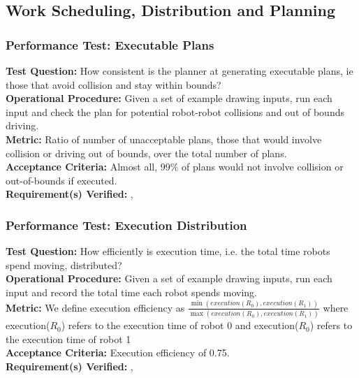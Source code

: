 
\subsection{Work Scheduling, Distribution and Planning}
\label{sec:verification_sdp}

\subsubsection{Performance Test: Executable Plans}
\label{test:sdp_pt_executable}
\textbf{Test Question:} How consistent is the planner at generating executable plans, ie those that avoid collision and stay within bounds? \\
\textbf{Operational Procedure:} Given a set of example drawing inputs, run each input and check the plan for potential robot-robot collisions and out of bounds driving. \\
\textbf{Metric:} Ratio of number of unacceptable plans, those that would involve collision or driving out of bounds, over the total number of plans. \\
\textbf{Acceptance Criteria:} Almost all, 99\% of plans would not involve collision or out-of-bounds if executed. \\
\textbf{Requirement(s) Verified:} , 

\subsubsection{Performance Test: Execution Distribution}
\label{test:sdp_pt_execu}
\textbf{Test Question:} How efficiently is execution time, i.e. the total time robots spend moving, distributed?\\
\textbf{Operational Procedure:} Given a set of example drawing inputs, run each input and record the total time each robot spends moving. \\
\textbf{Metric:} We define execution efficiency as $\frac{\min(execution(R_{0}), execution(R_{1}))}{\max(execution(R_{0}), execution(R_{1}))}$ where execution($R_{0}$) refers to the execution time of robot 0 and execution($R_{0}$) refers to the execution time of robot 1\\
\textbf{Acceptance Criteria:} Execution efficiency of 0.75.\\
\textbf{Requirement(s) Verified:} , 

